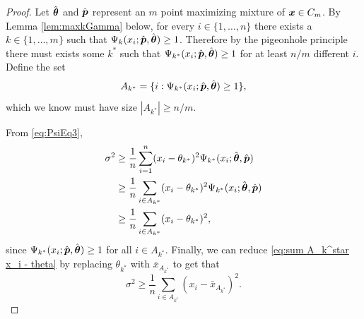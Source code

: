 		\begin{proof}
			Let $\hat{{\bm{{\theta}}}}$ and $\hat{{\bm{{p}}}}$ represent an $m$ point maximizing mixture of ${\bm{{x}}} \in C_m$. By Lemma \ref{lem:maxkGamma} below, for every $i \in \{1, \dots, n\}$ there exists a $k \in \{1, \dots, m\}$ such that $\Psi_{k}(x_i;\hat{{\bm{{p}}}},\hat{{\bm{{\theta}}}}) \geq 1$. Therefore by the pigeonhole principle there must exists some $k^*$ such that $\Psi_{k^*}(x_i;\hat{{\bm{{p}}}},\hat{{\bm{{\theta}}}}) \geq 1$ for at least $n / m$ different $i$. Define the set
			\begin{equation}
			 	A_{k^*} = \{i : \Psi_{k^*}(x_i;\hat{{\bm{{p}}}},\hat{{\bm{{\theta}}}}) \geq 1 \},
			\end{equation}
			which we know must have size $|A_{k^*}| \geq n/m$.


			From \eqref{eq:PsiEq3},
			\begin{align}
				\sigma^2 &\geq \frac{1}{n} \sum_{i=1}^n (x_i - \theta_{k^*})^2 \Psi_{k^*}(x_i; \hat{{\bm{{\theta}}}}, \hat{{\bm{{p}}}})\\ 
					&\geq \frac{1}{n} \sum_{i \in A_{k^*}} (x_i - \theta_{k^*})^2 \Psi_{k^*}(x_i; \hat{{\bm{{\theta}}}}, \hat{{\bm{{p}}}})\\
					&\geq \frac{1}{n} \sum_{i \in A_{k^*}} (x_i - \theta_{k^*})^2,
					\label{eq:sum A_k^star x_i - theta}
			\end{align}
			since $\Psi_{k^*}(x_i;\hat{{\bm{{p}}}},\hat{{\bm{{\theta}}}}) \geq 1$ for all $i \in A_{k^*}$. Finally, we can reduce \eqref{eq:sum A_k^star x_i - theta} by replacing $\theta_{k^*}$ with $\bar{x}_{A_{k^*}}$ to get that
			\begin{equation}
				\sigma^2 \geq \frac{1}{n} \sum_{i \in A_{k^*}} \left(x_i - \bar{x}_{A_{k^*}}\right)^2.
			\end{equation}
		\end{proof}

